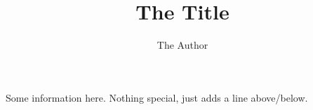 \documentclass[
  english,
  pagemark,
  stamp]{sdaps}
\author{The Author}
\title{The Title}
\begin{document}
  \begin{questionnaire}
    \begin{info}
      Some information here. Nothing special, just adds a line above/below.
    \end{info}

	


  \end{questionnaire}
\end{document}
